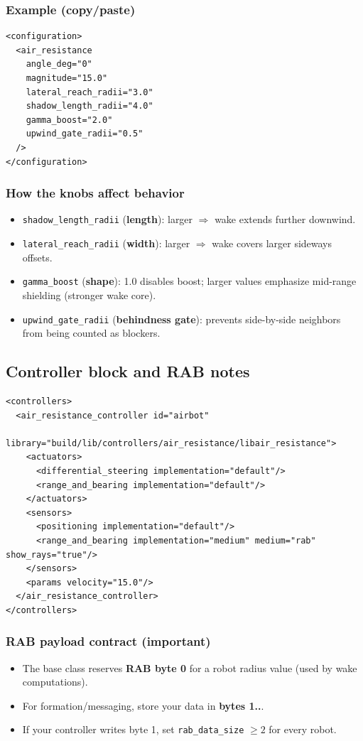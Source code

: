 \documentclass[11pt,a4paper]{article}
\begin{document}
\subsubsection*{Example (copy/paste)}
\begin{lstlisting}
<configuration>
  <air_resistance
    angle_deg="0"
    magnitude="15.0"
    lateral_reach_radii="3.0"
    shadow_length_radii="4.0"
    gamma_boost="2.0"
    upwind_gate_radii="0.5"
  />
</configuration>
\end{lstlisting}

\subsubsection*{How the knobs affect behavior}
\begin{itemize}
  \item \texttt{shadow\_length\_radii} (\textbf{length}): larger $\Rightarrow$ wake extends further downwind.
  \item \texttt{lateral\_reach\_radii} (\textbf{width}): larger $\Rightarrow$ wake covers larger sideways offsets.
  \item \texttt{gamma\_boost} (\textbf{shape}): 1.0 disables boost; larger values emphasize mid-range shielding (stronger wake core).
  \item \texttt{upwind\_gate\_radii} (\textbf{behindness gate}): prevents side-by-side neighbors from being counted as blockers.
\end{itemize}

\subsection{Controller block and RAB notes}
\begin{lstlisting}
<controllers>
  <air_resistance_controller id="airbot"
      library="build/lib/controllers/air_resistance/libair_resistance">
    <actuators>
      <differential_steering implementation="default"/>
      <range_and_bearing implementation="default"/>
    </actuators>
    <sensors>
      <positioning implementation="default"/>
      <range_and_bearing implementation="medium" medium="rab" show_rays="true"/>
    </sensors>
    <params velocity="15.0"/>
  </air_resistance_controller>
</controllers>
\end{lstlisting}

\subsubsection*{RAB payload contract (important)}
\begin{itemize}
  \item The base class reserves \textbf{RAB byte 0} for a robot radius value (used by wake computations).
  \item For formation/messaging, store your data in \textbf{bytes 1..}.
  \item If your controller writes byte 1, set \texttt{rab\_data\_size} $\ge 2$ for every robot.
\end{itemize}
\end{document}
